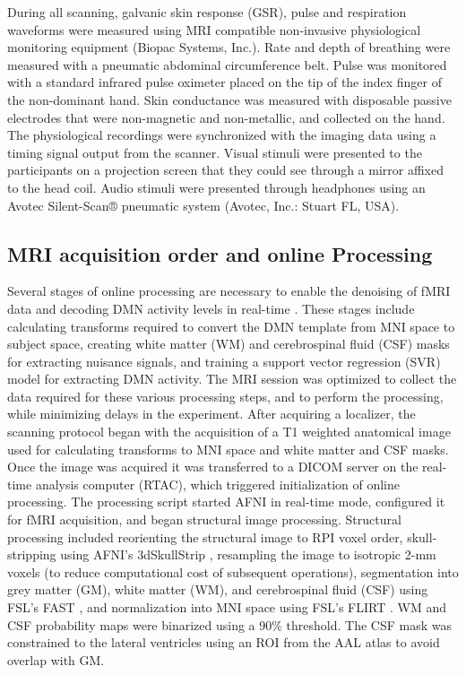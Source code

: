 During all scanning, galvanic skin response (GSR), pulse and respiration waveforms were measured using MRI compatible non-invasive physiological monitoring equipment (Biopac Systems, Inc.). Rate and depth of breathing were measured with a pneumatic abdominal circumference belt. Pulse was monitored with a standard infrared pulse oximeter placed on the tip of the index finger of the non-dominant hand. Skin conductance was measured with disposable passive electrodes that were non-magnetic and non-metallic, and collected on the hand. The physiological recordings were synchronized with the imaging data using a timing signal output from the scanner. Visual stimuli were presented to the participants on a projection screen that they could see through a mirror affixed to the head coil. Audio stimuli were presented through headphones using an Avotec Silent-Scan® pneumatic system (Avotec, Inc.: Stuart FL, USA).

\subsection{MRI acquisition order and online Processing}

Several stages of online processing are necessary to enable the denoising of fMRI data and decoding DMN activity levels in real-time \cite{Craddock2012}. These stages include calculating transforms required to convert the DMN template from MNI space to subject space, creating white matter (WM) and cerebrospinal fluid (CSF) masks for extracting nuisance signals, and training a support vector regression (SVR) model for extracting DMN activity. The MRI session was optimized to collect the data required for these various processing steps, and to perform the processing, while minimizing delays in the experiment.
After acquiring a localizer, the scanning protocol began with the acquisition of a T1 weighted anatomical image used for calculating transforms to MNI space and white matter and CSF masks. Once the image was acquired it was transferred to a DICOM server on the real-time analysis computer (RTAC), which triggered initialization of online processing. The processing script started AFNI in real-time mode, configured it for fMRI acquisition, and began structural image processing. Structural processing included reorienting the structural image to RPI voxel order, skull-stripping using AFNI’s 3dSkullStrip \cite{Cox1996}, resampling the image to isotropic 2-mm voxels (to reduce computational cost of subsequent operations), segmentation into grey matter (GM), white matter (WM), and cerebrospinal fluid (CSF) using FSL’s FAST \cite{Zhang2001}, and normalization into MNI space using FSL’s FLIRT \cite{Jenkinson2002,Jenkinson2001}. WM and CSF probability maps were binarized using a 90\% threshold. The CSF mask was constrained to the lateral ventricles using an ROI from the AAL atlas to avoid overlap with GM.

